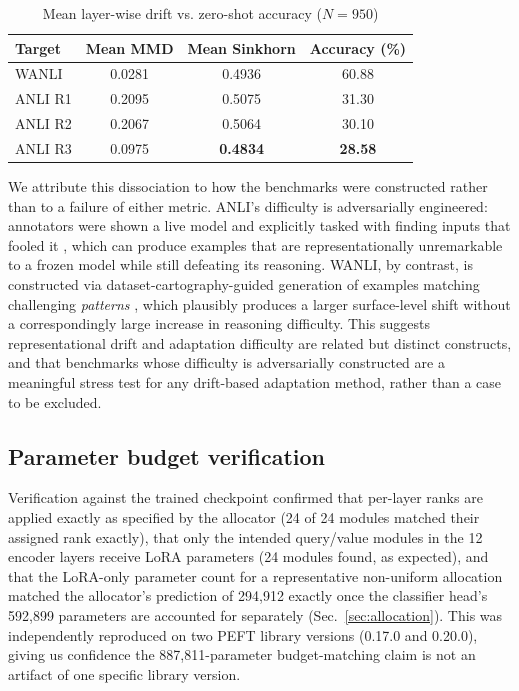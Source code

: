 \documentclass[conference]{IEEEtran}
\begin{document}
\begin{table}[htbp]
\caption{Mean layer-wise drift vs. zero-shot accuracy ($N{=}950$)}
\label{tab:driftvsdiff}
\centering
\begin{tabular}{lccc}
\toprule
Target & Mean MMD & Mean Sinkhorn & Accuracy (\%) \\
\midrule
WANLI & 0.0281 & 0.4936 & 60.88 \\
ANLI R1 & 0.2095 & 0.5075 & 31.30 \\
ANLI R2 & 0.2067 & 0.5064 & 30.10 \\
ANLI R3 & 0.0975 & \textbf{0.4834} & \textbf{28.58} \\
\bottomrule
\end{tabular}
\end{table}

We attribute this dissociation to how the benchmarks were constructed rather than to a failure of either metric. ANLI's difficulty is adversarially engineered: annotators were shown a live model and explicitly tasked with finding inputs that fooled it \cite{nie2020anli}, which can produce examples that are representationally unremarkable to a frozen model while still defeating its reasoning. WANLI, by contrast, is constructed via dataset-cartography-guided generation of examples matching challenging \emph{patterns} \cite{liu2022wanli}, which plausibly produces a larger surface-level shift without a correspondingly large increase in reasoning difficulty. This suggests representational drift and adaptation difficulty are related but distinct constructs, and that benchmarks whose difficulty is adversarially constructed are a meaningful stress test for any drift-based adaptation method, rather than a case to be excluded.

\subsection{Parameter budget verification}
Verification against the trained checkpoint confirmed that per-layer ranks are applied exactly as specified by the allocator (24 of 24 modules matched their assigned rank exactly), that only the intended query/value modules in the 12 encoder layers receive LoRA parameters (24 modules found, as expected), and that the LoRA-only parameter count for a representative non-uniform allocation matched the allocator's prediction of 294{,}912 exactly once the classifier head's 592{,}899 parameters are accounted for separately (Sec.~\ref{sec:allocation}). This was independently reproduced on two PEFT library versions (0.17.0 and 0.20.0), giving us confidence the 887{,}811-parameter budget-matching claim is not an artifact of one specific library version.
\end{document}
